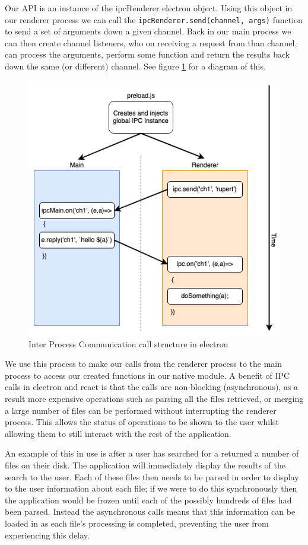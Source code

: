 \documentclass[a4paper,11pt]{article}
\newcommand{\code}[1]{\colorbox{codegray}{\texttt{#1}}}
\begin{document}
Our API is an instance of the ipcRenderer electron object. Using this object in our renderer process we can call the \code{ipcRenderer.send(channel, args)} function to send a set of arguments down a given channel. Back in our main process we can then create channel listeners, who on receiving a request from than channel, can process the arguments, perform some function and return the results back down the same (or different) channel. See figure \ref{fig:ipcCalls} for a diagram of this.

\begin{figure}
    \centering
    \includegraphics[width=0.6\linewidth]{diagrams/ipcCalls.drawio.png}
    \caption{Inter Process Communication call structure in electron}
    \label{fig:ipcCalls}
\end{figure}

We use this process to make our calls from the renderer process to the main process to access our created functions in our native module. A benefit of IPC calls in electron and react is that the calls are non-blocking (asynchronous), as a result more expensive operations such as parsing all the files retrieved, or merging a large number of files can be performed without interrupting the renderer process. This allows the status of operations to be shown to the user whilst allowing them to still interact with the rest of the application.

An example of this in use is after a user has searched for a returned a number of files on their disk. The application will immediately display the results of the search to the user. Each of these files then needs to be parsed in order to display to the user information about each file; if we were to do this synchronously then the application would be frozen until each of the possibly hundreds of files had been parsed. Instead the asynchronous calls means that this information can be loaded in as each file's processing is completed, preventing the user from experiencing this delay.
\end{document}
